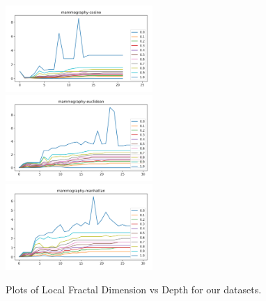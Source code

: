 \begin{figure}[!t]
\includegraphics[width=2.2in]{kdd/static/lfd_vs_depth/mammography-cosine.png}
\includegraphics[width=2.2in]{kdd/static/lfd_vs_depth/mammography-euclidean.png}
\includegraphics[width=2.2in]{kdd/static/lfd_vs_depth/mammography-manhattan.png}

\caption{
Plots of Local Fractal Dimension vs Depth for our datasets.
}

\label{results:lfd_4}
\end{figure}

